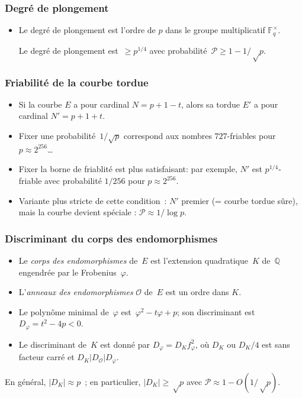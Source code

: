\documentclass[francais]{beamer}
\newcommand{\abs}[1]{\left| #1 \right|}
\newcommand{\F}{\mathbb{F}}
\newcommand{\prob}{\mathcal{P}}
\begin{document}
\begin{frame}\frametitle{Degré de plongement}
\begin{itemize}
\item Le degré de plongement est l'ordre de $p$
dans le groupe multiplicatif $\F_q^{×}$.
\begin{block}{}
Le degré de plongement est~$≥ p^{1/4}$
avec probabilité~$\prob ≥ 1-1/√p$.
\end{block}
\end{itemize}
\end{frame}

\begin{frame}\frametitle{Friabilité de la courbe tordue}
\begin{itemize}
\item Si la courbe $E$ a pour cardinal $N = p + 1 - t$,
alors sa tordue $E'$ a pour cardinal $N' = p + 1 + t$.
\bigskip
\item Fixer une probabilité~$1/\sqrt{p}$ correspond aux nombres
$727$-friables pour $p≈2^{256}$\ldots
\item Fixer la borne de friablité est plus satisfaisant:
par exemple, $N'$ est $p^{1/4}$-friable avec probabilité $1/256$
pour $p≈2^{256}$.
\bigskip
\item Variante plus stricte de cette condition : $N'$ premier (= courbe
tordue sûre), mais la courbe devient \og spéciale \fg : $\prob ≈ 1/\log p$.
\end{itemize}
\end{frame}

\begin{frame}\frametitle{Discriminant du corps des endomorphismes}
\begin{itemize}
\item Le \emph{corps des endomorphismes} de~$E$ est
l'extension quadratique~$K$ de~$ℚ$ engendrée par le Frobenius~$φ$.
\item L'\emph{anneaux des endomorphismes} $\mathcal{O}$ de~$E$ est un ordre dans $K$.
\item Le polynôme minimal de~$φ$ est~$φ^2 - t φ + p$;
son discriminant est~$D_{φ} = t^2 - 4p < 0$.
\item Le discriminant de~$K$ est donné par $D_{φ} = D_{K} f_{φ}^2$,
où $D_{K}$ ou $D_{K}/4$ est sans facteur carré et $D_K | D_{\mathcal{O}} | D_{φ}$.
\end{itemize}
\begin{block}{}
En général, $\abs{D_K} ≈ p$ ;
en particulier, $\abs{D_{K}} ≥ √p$ avec $\prob ≈ 1-O(1/√p)$.
\end{block}
\end{frame}
\end{document}
